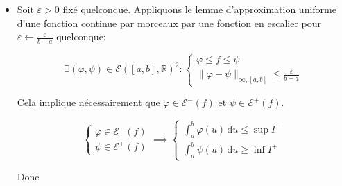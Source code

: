 \documentclass{article}
\begin{document}
\begin{question_kholle}
\begin{itemize}[label=$\lozenge$]
		
		\begin{align*}
			&\forall x \in [a, b], \varphi(x) \leqslant f(x) \leqslant \psi(x) \\
			&\implies \forall \varphi \in \mathcal{E}^{-}(f), \varphi \leqslant \psi &\implies \psi \text{ majore } \mathcal{E}^{-}(f) \\
			& &\implies \int_{a}^{b} \psi(u) \, \mathrm du  \text{ majore } I^{-} \\
			& \implies \sup I^{-} \leqslant \int_{a}^{b} \psi(u) \, \mathrm du  \\
			& \implies \forall \psi \in \mathcal{E}^{+}(f), \sup I^{-} \leqslant \int_{a}^{b} \psi(u)  \, \mathrm du & \implies \sup I^{-} \text{ minore } I^{-} \\
			& & \implies \sup I^{-} \leqslant \inf I^{+}
		\end{align*}
		
		
		\item Soit $\varepsilon > 0$ fixé quelconque.
		Appliquons le lemme d'approximation uniforme d'une fonction continue par morceaux par une fonction en escalier pour $\varepsilon \leftarrow \frac{\varepsilon}{b-a}$ quelconque:
		
$$
		\exists (\varphi, \psi) \in \mathcal{E}([a, b], \mathbb{R})^{2} : \left\{ \begin{array}{ll}
			\varphi \leqslant f \leqslant \psi \\
			\|\varphi - \psi\| _{\infty, [a, b]} \leqslant \frac{\varepsilon}{b-a}
		\end{array}\right.
$$
		
		Cela implique nécessairement que $\varphi \in \mathcal{E}^{-}(f)$ et $\psi \in \mathcal{E}^{+}(f)$.
		
$$
		\left\{ \begin{array}{ll}
			\varphi \in \mathcal{E}^{-}(f) \\
			\psi \in \mathcal{E}^{+}(f)
		\end{array}\right. \implies \left\{ \begin{array}{ll}
			\int_{a}^{b} \varphi (u) \, \mathrm du \leqslant \sup I^{-} \\
			\int_{a}^{b} \psi(u) \, \mathrm du \geqslant \inf I^{+}
		\end{array}\right.
$$
		
		Donc
		

\end{itemize}
\end{question_kholle}
\end{document}
